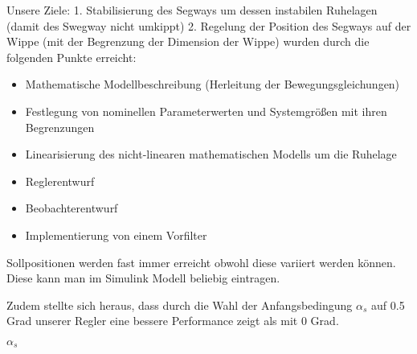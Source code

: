 \documentclass[pdf]{ifacconf}
\begin{document}
Unsere Ziele: 1. Stabilisierung des Segways um dessen instabilen Ruhelagen (damit des Swegway nicht umkippt) 2. Regelung der Position des Segways auf der Wippe (mit der Begrenzung der Dimension der Wippe) wurden durch die folgenden Punkte erreicht:

\begin{itemize}
\item Mathematische Modellbeschreibung (Herleitung der Bewegungsgleichungen)  
\item Festlegung von nominellen Parameterwerten und Systemgrößen mit ihren Begrenzungen  
\item Linearisierung des nicht-linearen mathematischen Modells um die Ruhelage
\item Reglerentwurf
\item Beobachterentwurf
\item Implementierung von einem Vorfilter
\end{itemize}

Sollpositionen werden fast immer erreicht obwohl diese variiert werden können. Diese kann man im Simulink Modell beliebig eintragen.

Zudem stellte sich heraus, dass durch die Wahl der Anfangsbedingung $\alpha^{}_{s}$ auf 0.5 Grad unserer Regler eine bessere Performance zeigt als mit 0 Grad.  
  



$\alpha^{}_{s}$


%






%
%

\end{document}
